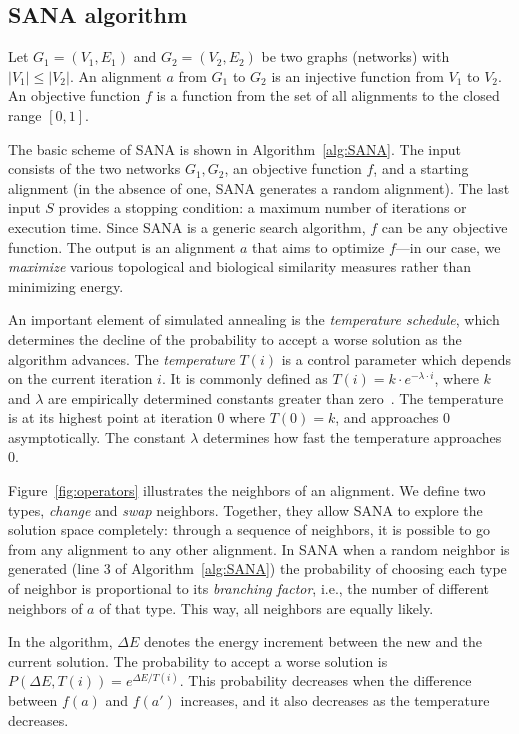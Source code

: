 \documentclass{bioinfo}
\begin{document}
\begin{methods}
\subsection{SANA algorithm}
Let $G_1=(V_1,E_1)$ and $G_2=(V_2,E_2)$ be two graphs (networks) with $|V_1|\leq|V_2|$. An alignment $a$ from $G_1$ to $G_2$ is an injective function from $V_1$ to $V_2$. An objective function $f$ is a function from the set of all alignments to the closed range $[0,1]$.

The basic scheme of SANA is shown in Algorithm~\ref{alg:SANA}. The input consists of the two networks $G_1,G_2$, an objective function $f$, and a starting alignment (in the absence of one, SANA generates a random alignment). The last input $S$ provides a stopping condition: a maximum number of iterations or execution time. Since SANA is a generic search algorithm, $f$ can be any objective function. The output is an alignment $a$ that aims to optimize $f$---in our case, we {\it maximize} various topological and biological similarity measures rather than minimizing energy.

An important element of simulated annealing is the \textit{temperature schedule}, which determines the decline of the probability to accept a worse solution as the algorithm advances. The \textit{temperature} $T(i)$ is a control parameter which depends on the current iteration $i$. It is commonly defined as $T(i)=k\cdot e^{-\lambda\cdot i}$, where $k$ and $\lambda$ are empirically determined constants greater than zero~\citep{SA1}. The temperature is at its highest point at iteration 0 where $T(0)=k$, and approaches 0 asymptotically. The constant $\lambda$ determines how fast the temperature approaches 0.

Figure~\ref{fig:operators} illustrates the neighbors of an alignment. We define two types, \textit{change} and \textit{swap} neighbors. Together, they allow SANA to explore the solution space completely: through a sequence of neighbors, it is possible to go from any alignment to any other alignment. In SANA when a random neighbor is generated (line 3 of Algorithm~\ref{alg:SANA}) the probability of choosing each type of neighbor is proportional to its \textit{branching factor}, i.e., the number of different neighbors of $a$ of that type. This way, all neighbors are equally likely.

In the algorithm, $\Delta E$ denotes the energy increment between the new and the current solution. The probability to accept a worse solution is $P(\Delta E, T(i)) = e^{\Delta E/T(i)}$. This probability decreases when the difference between $f(a)$ and $f(a')$ increases, and it also decreases as the temperature decreases.


\end{methods}
\end{document}
